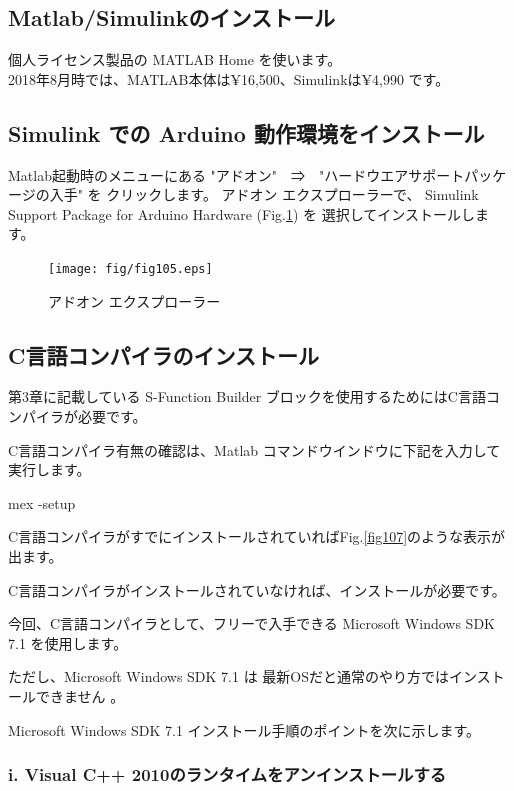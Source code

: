 \subsection{Matlab/Simulinkのインストール}\label{ux6a5fux4f54}

個人ライセンス製品の MATLAB Home \cite{MathWorks_HP} を使います。\\
2018年8月時では、MATLAB本体は¥16,500、Simulinkは¥4,990 です。


\subsection{Simulink での Arduino 動作環境をインストール}\label{ux6a5fux4f55}

Matlab起動時のメニューにある "アドオン"　⇒　"ハードウエアサポートパッケージの入手" を
クリックします。
アドオン エクスプローラーで、
Simulink Support Package for Arduino Hardware (Fig.\ref{fig105}) を
選択してインストールします。

\begin{figure}[htbp]
  \centering
  \texttt{[image: fig/fig105.eps]}
  \caption{アドオン エクスプローラー}
  \label{fig105}
  \end{figure}


\subsection{C言語コンパイラのインストール}\label{ux5bfeux7b56ux6848}

第3章に記載している S-Function Builder ブロックを使用するためにはC言語コンパイラが必要です。

C言語コンパイラ有無の確認は、Matlab コマンドウインドウに下記を入力して実行します。

mex -setup

C言語コンパイラがすでにインストールされていればFig.\ref{fig107}のような表示が出ます。

C言語コンパイラがインストールされていなければ、インストールが必要です。

今回、C言語コンパイラとして、フリーで入手できる Microsoft Windows SDK 7.1 を使用します。

ただし、Microsoft Windows SDK 7.1 は
最新OSだと通常のやり方ではインストールできません\cite{Win_SDK1} \cite{Win_SDK2}。

Microsoft Windows SDK 7.1 インストール手順のポイントを次に示します。


\subsubsection{i. Visual C++ 2010のランタイムをアンインストールする}\label{sec:section1.4.1-1}

